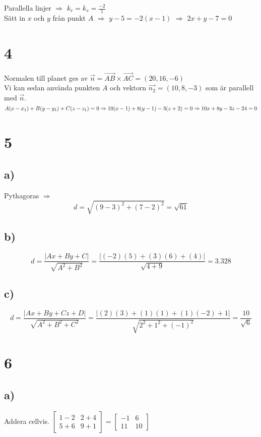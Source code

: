 \documentclass{article}
\begin{document}
\noindent
Parallella linjer $\Rightarrow$ $k_{r} = k_{s} = \frac{-2}{1}$\\
Sätt in $x$ och $y$ från punkt $A$ $\Rightarrow$ $y-5 = -2(x-1)$ $\Rightarrow$ 
$2x+y-7=0$\\

\section*{4}
Normalen till planet ges av $\overrightarrow{n}=\overrightarrow{AB} \times 
\overrightarrow{AC} = (20,16,-6)$\\
Vi kan sedan använda punkten $A$ och vektorn $\overrightarrow{n_{2}}=
(10,8,-3)$ som är parallell med $\overrightarrow{n}$.\\
$A(x-x_{1})+B(y-y_{1})+C(z-z_{1})=0 \Rightarrow \\
10(x-1)+8(y-1)-3(z+2)=0 \Rightarrow \\
10x+8y-3z-24=0$

\section*{5}
\subsection*{a)}
Pythagoras $\Rightarrow$ $$d = \sqrt{(9-3)^2+(7-2)^2} = \sqrt{61}$$

\subsection*{b)}
$$d = \frac{|Ax+By+C|}{\sqrt{A^2+B^2}} = 
      \frac{|(-2)(5)+(3)(6)+(4)|}{\sqrt{4+9}} = 
      3.328$$

\subsection*{c)}
$$d = \frac{|Ax+By+Cz+D|}{\sqrt{A^2+B^2+C^2}} = 
      \frac{|(2)(3)+(1)(1)+(1)(-2)+1|}{\sqrt{2^2+1^2+(-1)^2}} = 
      \frac{10}{\sqrt{6}}$$

\section*{6}
\subsection*{a)}
Addera cellvis.
$ 
    			\begin{bmatrix}
    			1-2 & 2+4 \\
    			5+6 & 9+1
    			\end{bmatrix}
    			=
    			\begin{bmatrix}
    			-1 & 6 \\
    			11  & 10
    			\end{bmatrix}
    			$
    			
\end{document}
